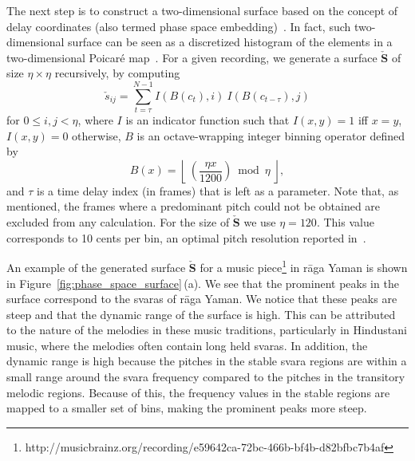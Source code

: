 The next step is to construct a two-dimensional surface based on the concept of delay coordinates (also termed phase space embedding)~\cite{takens1981detecting, Kantz04BOOK}. In fact, such two-dimensional surface can be seen as a discretized histogram of the elements in a two-dimensional Poicar\'e map~\cite{Kantz04BOOK}. For a given recording, we generate a surface $\check{\mathbf{S}}$ of size $\eta\times\eta$ recursively, by computing
\begin{equation*}
\check{s}_{ij} = \sum_{t=\tau}^{N-1} I\left(B\left(c_t\right),i\right)~ I\left(B\left(c_{t-\tau}\right),j\right) %
\end{equation*}
for $0 \leq i,j < \eta$, where $I$ is an indicator function such that $I(x,y)=1$ iff $x=y$, $I(x,y)=0$ otherwise, $B$ is an octave-wrapping integer binning operator defined by
\begin{equation}	
\label{eq:binning_function}	
B(x) = \left\lfloor ~\left(\frac{\eta x}{1200}\right) \bmod \eta ~\right\rfloor,
\end{equation}
and $\tau$ is a time delay index (in frames) that is left as a parameter. Note that, as mentioned, the frames where a predominant pitch could not be obtained are excluded from any calculation. For the size of $\check{\mathbf{S}}$ we use $\eta = 120$. This value  corresponds to 10 cents per bin, an optimal pitch resolution reported in~\cite{chordia2013joint}. %

An example of the generated surface $\check{\mathbf{S}}$ for a music piece\footnote{http://musicbrainz.org/recording/e59642ca-72bc-466b-bf4b-d82bfbc7b4af} in r\={a}ga Yaman is shown in Figure~\ref{fig:phase_space_surface}\,(a). We see that the prominent peaks in the surface correspond to the svaras of r\={a}ga Yaman. We notice that these peaks are steep and that the dynamic range of the surface is high. This can be attributed to the nature of the melodies in these music traditions, particularly in Hindustani music, where the melodies often contain long held svaras. In addition, the dynamic range is high because the pitches in the stable svara regions are within a small range around the svara frequency compared to the pitches in the transitory melodic regions. Because of this, the frequency values in the stable regions are mapped to a smaller set of bins, making the prominent peaks more steep.

